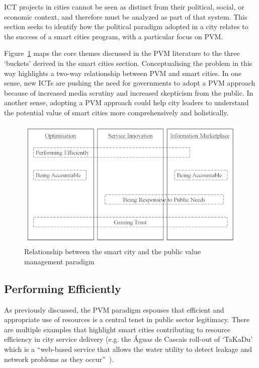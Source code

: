\documentclass[conference]{IEEEtran}
\begin{document}
ICT projects in cities cannot be seen as distinct from their
political, social, or economic context, and therefore must be analyzed
as part of that system. This section seeks to identify how the
political paradigm adopted in a city relates to the success of a smart
cities program, with a particular focus on PVM.

Figure~\ref{fig:smartcitypvm} maps the core themes discussed in the
PVM literature to the three `buckets' derived in the smart cities
section. Conceptualising the problem in this way highlights a two-way
relationship between PVM and smart cities. In one sense, new ICTs are
pushing the need for governments to adopt a PVM approach because of
increased media scrutiny and increased skepticism from the public. In
another sense, adopting a PVM approach could help city leaders to
understand the potential value of smart cities more comprehensively
and holistically.

\begin{figure}[!ht]
\centering
\includegraphics[width=\columnwidth]{smartcitypvm.png}
\caption{Relationship between the smart city and the public value management paradigm}
\label{fig:smartcitypvm} 
\end{figure}


\subsection{Performing Efficiently}
As previously discussed, the PVM paradigm espouses that efficient and
appropriate use of resources is a central tenet in public sector
legitimacy. There are multiple examples that highlight smart cities
contributing to resource efficiency in city service delivery (e.g. the
\'{A}guas de Cascais roll-out of `TaKaDu' which is a ``web-based service
that allows the water utility to detect leakage and network problems
as they occur''~\cite{prwebport:2012}).
\end{document}
